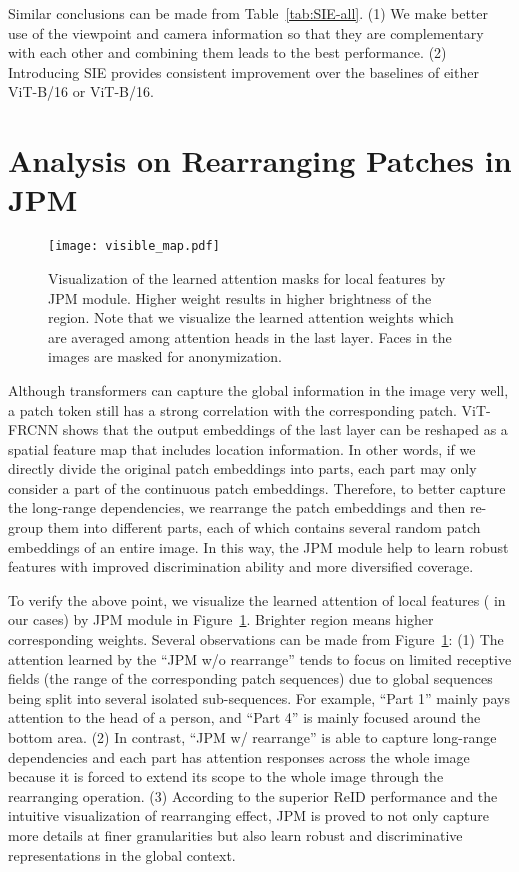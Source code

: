 \documentclass[10pt,twocolumn,letterpaper]{article}
\begin{document}
Similar conclusions can be made from Table~\ref{tab:SIE-all}. (1) We make better use of the viewpoint and camera information so that they are complementary with each other and combining them leads to the best performance. (2) Introducing SIE provides consistent improvement over the baselines of either ViT-B/16 or ViT-B/16.


\section {Analysis on Rearranging Patches in JPM}
\begin{figure}[t]
    \centering
    \texttt{[image: visible\_map.pdf]}
	\vspace{-1.5em}
	\caption{Visualization of the learned attention masks for local features by JPM module. Higher weight results in higher brightness of the region. Note that we visualize the learned attention weights which are averaged among attention heads in the last layer. Faces in the images are masked for anonymization.} 
	\vspace{-1.em}
	\label{fig:vis}
\end{figure}

Although transformers can capture the global information in the image very well, a patch token still has a strong correlation with the corresponding patch. ViT-FRCNN \cite{ViT_FRCNN} shows that the output embeddings of the last layer can be reshaped as a spatial feature map that includes location information. In other words, if we directly divide the original patch embeddings into  parts, each part 
may only consider a part of the continuous patch embeddings. Therefore, to better capture the long-range dependencies, we rearrange the patch embeddings and then re-group them into different parts, each of which contains several random patch embeddings of an entire image. In this way, the JPM module help to learn robust features with improved discrimination ability and more diversified coverage. 

To verify the above point, we visualize the learned attention of local features  ( in our cases) by JPM module in Figure~\ref{fig:vis}. Brighter region means higher corresponding weights. Several observations can be made from Figure~\ref{fig:vis}:
(1) The attention learned by the ``JPM w/o rearrange'' tends to focus on limited receptive fields (\ie the range of the corresponding patch sequences) due to global sequences being split into several isolated sub-sequences. For example, ``Part 1'' mainly pays attention to the head of a person, and ``Part 4'' is mainly focused around the bottom area. 
(2) In contrast, ``JPM w/ rearrange'' is able to capture long-range dependencies and each part has attention responses across the whole image because it is forced to extend its scope to the whole image through the rearranging operation. 
(3) According to the superior ReID performance and the intuitive visualization of rearranging effect, JPM is proved to not only capture more details at finer granularities but also learn robust and discriminative representations in the global context.
\end{document}
